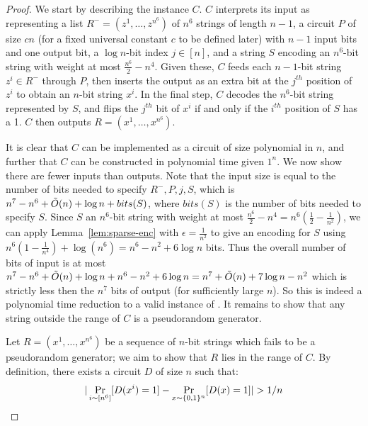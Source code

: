 \begin{proof}
We start by describing the \avoid instance $C$. $C$ interprets its input as representing a list $R^- = (z^1, \ldots, z^{n^6})$ of $n^6$ strings of length $n-1$, a circuit $P$ of size $cn$ (for a fixed universal constant $c$ to be defined later) with $n-1$ input bits and one output bit, a $\log n$-bit index $j \in [n]$, and a string $S$ encoding an $n^6$-bit string with weight at most $\frac{n^6}{2} - n^4$. Given these, $C$ feeds each $n-1$-bit string $z^i \in R^-$ through $P$, then inserts the output as an extra bit at the $j^{th}$ position of $z^i$ to obtain an $n$-bit string $x^i$. In the final step, $C$ decodes the $n^6$-bit string represented by $S$, and flips the $j^{th}$ bit of $x^i$ if and only if the $i^{th}$ position of $S$ has a 1. $C$ then outputs $R = (x^1, \ldots, x^{n^6})$.

It is clear that $C$ can be implemented as a circuit of size polynomial in $n$, and further that $C$ can be constructed in polynomial time given $1^n$. We now show there are fewer inputs than outputs. Note that the input size is equal to the number of bits needed to specify $R^-, P, j, S$, which is $n^7 - n^6 + \Tilde{O}(n) + \log n + bits(S)$, where $bits(S)$ is the number of bits needed to specify $S$. Since $S$ an $n^6$-bit string with weight at most $\frac{n^6}{2} - n^4 = n^6(\frac{1}{2} - \frac{1}{n^2})$, we can apply Lemma~\ref{lem:sparse-enc} with $\epsilon=\frac{1}{n^2}$ to give an encoding for $S$ using $n^6(1-\frac{1}{n^4}) + \log (n^6) = n^6 - n^2 + 6\log n$ bits. Thus the overall number of bits of input is at most $n^7 - n^6 + \Tilde{O}(n) + \log n + n^6 - n^2 + 6\log n = n^7 + \Tilde{O}(n) + 7\log n - n^2$ which is strictly less then the $n^7$ bits of output (for sufficiently large $n$). So this is indeed a polynomial time reduction to a valid instance of \avoid. It remains to show that any string outside the range of $C$ is a pseudorandom generator.

Let $R = (x^1, \ldots, x^{n^6})$ be a sequence of $n$-bit strings which fails to be a pseudorandom generator; we aim to show that $R$ lies in the range of $C$. By definition, there exists a circuit $D$ of size $n$ such that:
\[
|\Pr_{i \sim [n^6]}[D(x^i)=1] - \Pr_{x\sim \B^n}[D(x)=1]| > 1/n
\]


\end{proof}

